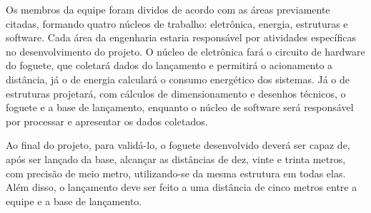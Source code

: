     Os membros da equipe foram dividos de acordo com as áreas previamente citadas, formando quatro núcleos de trabalho: eletrônica, energia, estruturas e software. Cada área da engenharia estaria responsável por atividades específicas no desenvolvimento do projeto. O núcleo de eletrônica fará o circuito de hardware do foguete, que coletará dados do lançamento e permitirá o acionamento a distância, já o de energia calculará o consumo energético dos sistemas. Já o de estruturas projetará, com cálculos de dimensionamento e desenhos técnicos, o foguete e a base de lançamento, enquanto o núcleo de software será responsável por processar e apresentar os dados coletados.

    Ao final do projeto, para validá-lo, o foguete desenvolvido deverá ser capaz de, após ser lançado da base, alcançar as distâncias de dez, vinte e trinta metros, com precisão de meio metro, utilizando-se da mesma estrutura em todas elas. Além disso, o lançamento deve ser feito a uma distância de cinco metros entre a equipe e a base de lançamento.
    



    
